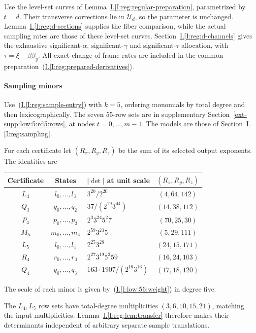 \documentclass[11pt]{amsart}
\theoremstyle{definition}
\theoremstyle{remark}
\numberwithin{equation}{section}
\newcommand{\partIref}[1]{\hyperref[I:#1]{I.\ref*{I:#1}}}
\newcommand{\partIeqref}[1]{\textup{(\partIref{#1})}}
\begin{document}
Use the level-set curves of Lemma~\partIref{reg:regular-preparation}, parametrized by $t=d$. Their transverse corrections lie in $\mathcal U_d$, so the parameter is unchanged. Lemma~\partIref{reg:d-sections} supplies the fiber comparison, while the actual sampling rates are those of these level-set curves. Section~\partIref{reg:d-channels} gives the exhaustive significant-$\alpha$, significant-$\gamma$ and significant-$\tau$ allocation, with $\tau=\xi-\beta\beta_y$. All exact change of frame rates are included in the common preparation~\partIeqref{reg:prepared-derivatives}.

\paragraph{Sampling minors}

Use~\partIeqref{reg:sample-entry} with $k=5$, ordering monomials by total degree and then lexicographically. The seven $55$-row sets are in supplementary Section~\ref{ext-supp:low:5:rd5:rows}, at nodes $t=0,\ldots,m-1$. The models are those of Section~\partIref{reg:sampling}.

For each certificate let $(R_x,R_y,R_z)$ be the sum of its selected output exponents. The identities are
\begin{center}
\begin{tabular}{cclc}
Certificate & States & $|\det|$ at unit scale & $(R_x,R_y,R_z)$\\\hline
$L_4$ & $l_0,\ldots,l_3$ & $3^{20}/2^{20}$ & $(4,64,142)$\\
$Q_3$ & $q_0,\ldots,q_2$ & $37/(2^{19}3^{44})$ & $(14,38,112)$\\
$P_4$ & $p_0,\ldots,p_3$ & $2^3 3^{24}5^2 7$ & $(70,25,30)$\\
$M_5$ & $m_0,\ldots,m_4$ & $2^{59}3^{23}5$ & $(5,29,111)$\\
$L_5$ & $l_0,\ldots,l_4$ & $2^{25}3^{28}$ & $(24,15,171)$\\
$R_4$ & $r_0,\ldots,r_3$ & $2^{27}3^{19}5^3 59$ & $(16,24,103)$\\
$Q_4$ & $q_0,\ldots,q_3$ & $163\cdot1907/(2^{16}3^{16})$ & $(17,18,120)$
\end{tabular}
\end{center}
The scale of each minor is given by~\partIeqref{low:56:weight} in degree five.

The $L_4,L_5$ row sets have total-degree multiplicities $(3,6,10,15,21)$, matching the input multiplicities. Lemma~\partIref{reg:lem:transfer} therefore makes their determinants independent of arbitrary separate sample translations.
\end{document}
